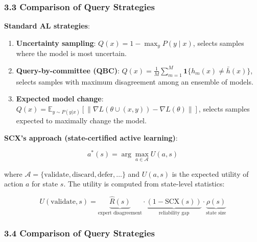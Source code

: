 \documentclass[
  12pt,
]{article}
\begin{document}
\subsubsection{3.3 Comparison of Query
Strategies}\label{comparison-of-query-strategies}

\textbf{Standard AL strategies}:

\begin{enumerate}
\def\labelenumi{\arabic{enumi}.}
\item
  \textbf{Uncertainty sampling}: \(Q(x) = 1 - \max_y P(y \mid x)\),
  selects samples where the model is most uncertain.
\item
  \textbf{Query-by-committee (QBC)}:
  \(Q(x) = \frac{1}{M}\sum_{m=1}^M \mathbf{1}\{h_m(x) \neq \bar{h}(x)\}\),
  selects samples with maximum disagreement among an ensemble of models.
\item
  \textbf{Expected model change}:
  \(Q(x) = \mathbb{E}_{y \sim P(y|x)}[\|\nabla L(\theta \cup (x,y)) - \nabla L(\theta)\|]\),
  selects samples expected to maximally change the model.
\end{enumerate}

\textbf{SCX's approach (state-certified active learning)}:

\[a^*(s) = \arg\max_{a \in \mathcal{A}} U(a, s)\]

where
\(\mathcal{A} = \{\text{validate}, \text{discard}, \text{defer}, \ldots\}\)
and \(U(a, s)\) is the expected utility of action \(a\) for state \(s\).
The utility is computed from state-level statistics:

\[U(\text{validate}, s) = \underbrace{\hat{R}(s)}_{\text{expert disagreement}} \cdot \underbrace{(1 - \text{SCX}(s))}_{\text{reliability gap}} \cdot \underbrace{\rho(s)}_{\text{state size}}\]

\subsubsection{3.4 Comparison of Query
Strategies}\label{comparison-of-query-strategies-1}
\end{document}
